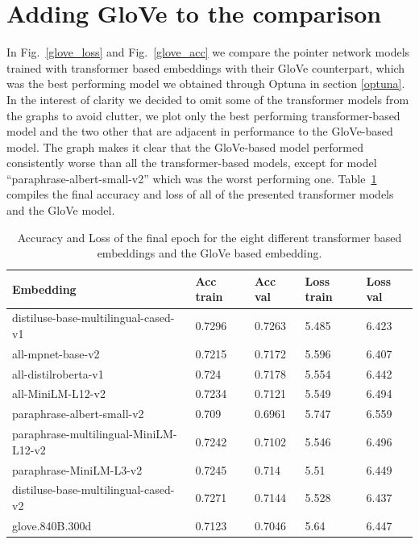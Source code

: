 \newpage

\section{Adding GloVe to the comparison}


In Fig.~\ref{glove_loss} and Fig.~\ref{glove_acc} we compare the pointer network models trained with transformer based embeddings with their GloVe counterpart, which was the best performing model we obtained through Optuna in section \ref{optuna}. In the interest of clarity we decided to omit some of the  transformer models from the graphs to avoid clutter, we plot only the best performing transformer-based model and the two other that are adjacent in performance to the GloVe-based model. The graph makes it clear that the GloVe-based model performed consistently worse than all the transformer-based models, except for model ``paraphrase-albert-small-v2'' which was the worst performing one. Table~\ref{table:glove} compiles the final accuracy and loss of all of the presented transformer models and the GloVe model.

\begin{table}[]
\begin{tabular}{l|llll}
Embedding                             & Acc train & Acc val & Loss train & Loss val \\ \hline
distiluse-base-multilingual-cased-v1  & 0.7296    & 0.7263  & 5.485      & 6.423    \\
all-mpnet-base-v2                     & 0.7215    & 0.7172  & 5.596      & 6.407    \\
all-distilroberta-v1                  & 0.724     & 0.7178  & 5.554      & 6.442    \\
all-MiniLM-L12-v2                     & 0.7234    & 0.7121  & 5.549      & 6.494    \\
paraphrase-albert-small-v2            & 0.709     & 0.6961  & 5.747      & 6.559    \\
paraphrase-multilingual-MiniLM-L12-v2 & 0.7242    & 0.7102  & 5.546      & 6.496    \\
paraphrase-MiniLM-L3-v2               & 0.7245    & 0.714   & 5.51       & 6.449    \\
distiluse-base-multilingual-cased-v2  & 0.7271    & 0.7144  & 5.528      & 6.437    \\
\rowcolor[HTML]{F9F5E9} 
glove.840B.300d                         & 0.7123    & 0.7046  & 5.64       & 6.447   
\end{tabular}
\caption{Accuracy and Loss of the final epoch for the eight different transformer based embeddings and the GloVe based embedding.}
\label{table:glove}
\end{table}


